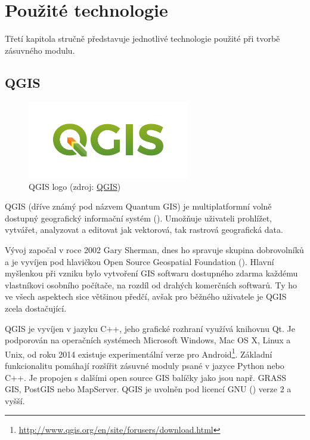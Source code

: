 \chapter{Použité technologie}
\label{3-technologie}

Třetí kapitola stručně představuje jednotlivé technologie použité při
tvorbě zásuvného modulu.

\section{QGIS}

\begin{figure}[H] \centering
      \includegraphics[width=200pt]{./pictures/qgis-logo.png}
      \caption[QGIS logo]{QGIS logo (zdroj:
\href{https://www.qgis.org/en/_downloads/qgis-logo.png}{QGIS})}
      \label{fig:qgis}
  \end{figure}

QGIS (dříve známý pod názvem Quantum GIS) je multiplatformní volně
dostupný geografický informační systém (). Umožňuje uživateli
prohlížet, vytvářet, analyzovat a editovat jak vektorová, tak rastrová
geografická data.

Vývoj započal v roce 2002 Gary Sherman, dnes ho spravuje skupina
dobrovolníků a je vyvíjen pod hlavičkou Open Source Geospatial
Foundation (). Hlavní myšlenkou při vzniku bylo vytvoření
GIS softwaru dostupného zdarma každému vlastníkovi osobního počítače,
na rozdíl od drahých komerčních softwarů. Ty ho ve všech aspektech
sice většinou předčí, avšak pro běžného uživatele je QGIS zcela
dostačující.

QGIS je vyvíjen v jazyku C++, jeho grafické rozhraní využívá knihovnu
Qt. Je podporován na operačních systémech Microsoft Windows, Mac OS X,
Linux a Unix, od roku 2014 existuje experimentální verze pro
Android\footnote{\url{http://www.qgis.org/en/site/forusers/download.html}}. Základní
funkcionalitu pomáhají rozšířit zásuvné moduly psané v jazyce Python
nebo C++. Je propojen s dalšími open source GIS balíčky jako jsou
např. GRASS GIS, PostGIS nebo MapServer. QGIS je uvolněn pod licencí
GNU () verze 2 a vyšší.

